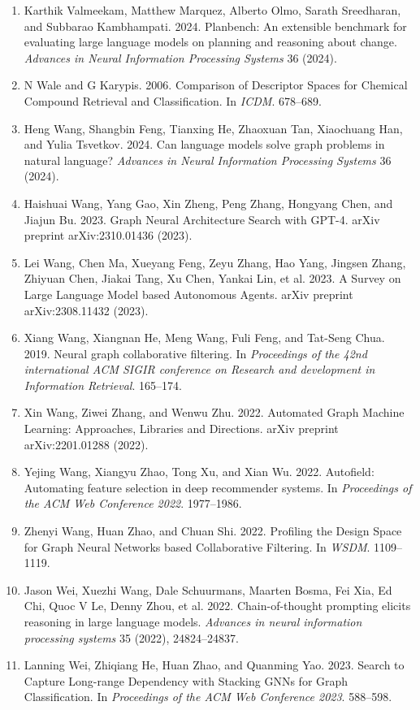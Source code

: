 \documentclass[11pt,UTF8,fontset=fandol]{ctexart}
\begin{document}
\begin{enumerate}[leftmargin=2em,labelsep=0.5em]
\item Karthik Valmeekam, Matthew Marquez, Alberto Olmo, Sarath Sreedharan, and Subbarao Kambhampati. 2024. Planbench: An extensible benchmark for evaluating large language models on planning and reasoning about change. \textit{Advances in Neural Information Processing Systems} 36 (2024).
\item N Wale and G Karypis. 2006. Comparison of Descriptor Spaces for Chemical Compound Retrieval and Classification. In \textit{ICDM}. 678--689.
\item Heng Wang, Shangbin Feng, Tianxing He, Zhaoxuan Tan, Xiaochuang Han, and Yulia Tsvetkov. 2024. Can language models solve graph problems in natural language? \textit{Advances in Neural Information Processing Systems} 36 (2024).
\item Haishuai Wang, Yang Gao, Xin Zheng, Peng Zhang, Hongyang Chen, and Jiajun Bu. 2023. Graph Neural Architecture Search with GPT-4. arXiv preprint arXiv:2310.01436 (2023).
\item Lei Wang, Chen Ma, Xueyang Feng, Zeyu Zhang, Hao Yang, Jingsen Zhang, Zhiyuan Chen, Jiakai Tang, Xu Chen, Yankai Lin, et al. 2023. A Survey on Large Language Model based Autonomous Agents. arXiv preprint arXiv:2308.11432 (2023).
\item Xiang Wang, Xiangnan He, Meng Wang, Fuli Feng, and Tat-Seng Chua. 2019. Neural graph collaborative filtering. In \textit{Proceedings of the 42nd international ACM SIGIR conference on Research and development in Information Retrieval}. 165--174.
\item Xin Wang, Ziwei Zhang, and Wenwu Zhu. 2022. Automated Graph Machine Learning: Approaches, Libraries and Directions. arXiv preprint arXiv:2201.01288 (2022).
\item Yejing Wang, Xiangyu Zhao, Tong Xu, and Xian Wu. 2022. Autofield: Automating feature selection in deep recommender systems. In \textit{Proceedings of the ACM Web Conference 2022}. 1977--1986.
\item Zhenyi Wang, Huan Zhao, and Chuan Shi. 2022. Profiling the Design Space for Graph Neural Networks based Collaborative Filtering. In \textit{WSDM}. 1109--1119.
\item Jason Wei, Xuezhi Wang, Dale Schuurmans, Maarten Bosma, Fei Xia, Ed Chi, Quoc V Le, Denny Zhou, et al. 2022. Chain-of-thought prompting elicits reasoning in large language models. \textit{Advances in neural information processing systems} 35 (2022), 24824--24837.
\item Lanning Wei, Zhiqiang He, Huan Zhao, and Quanming Yao. 2023. Search to Capture Long-range Dependency with Stacking GNNs for Graph Classification. In \textit{Proceedings of the ACM Web Conference 2023}. 588--598.

\end{enumerate}
\end{document}
